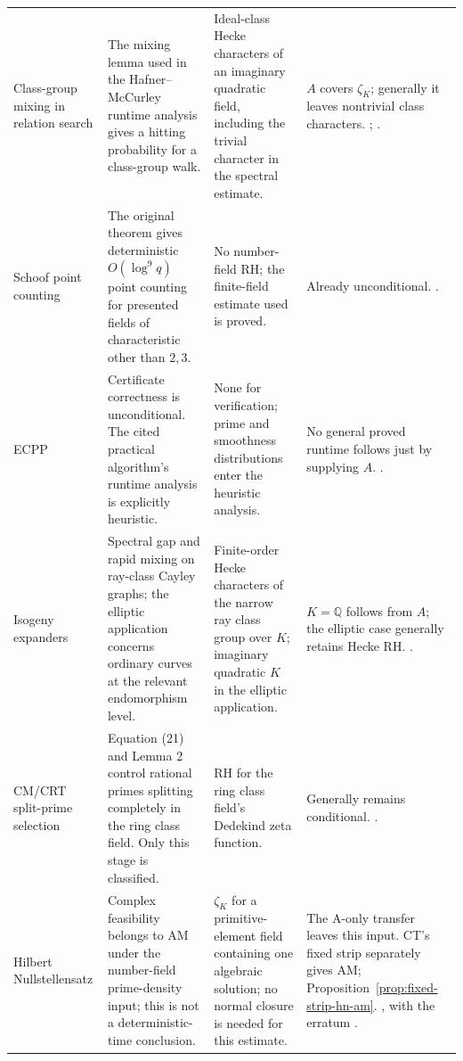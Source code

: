 \documentclass[11pt]{article}
\newcommand{\Q}{\mathbb Q}
\theoremstyle{definition}
\theoremstyle{remark}
\begin{document}
\begin{longtable}{@{}p{}p{}p{}p{}@{}}
Class-group mixing in relation search & The mixing lemma used in the Hafner--McCurley runtime analysis gives a hitting probability for a class-group walk. & Ideal-class Hecke characters of an imaginary quadratic field, including the trivial character in the spectral estimate. & $A$ covers $\zeta_K$; generally it leaves nontrivial class characters. \citet[Prop.~1, author pp.~8--9]{BiasseErukulangara2023}; \citet[Cor.~1.3, proof p.~9]{JMV2009}. \\
Schoof point counting & The original theorem gives deterministic $O(\log^9q)$ point counting for presented fields of characteristic other than $2,3$. & No number-field RH; the finite-field estimate used is proved. & Already unconditional. \citet[pp.~483, 485--490]{Schoof1985}. \\
ECPP & Certificate correctness is unconditional. The cited practical algorithm's runtime analysis is explicitly heuristic. & None for verification; prime and smoothness distributions enter the heuristic analysis. & No general proved runtime follows just by supplying $A$. \citet[Thm.~5.2, p.~121; pp.~122, 124--125]{Schoof2008}. \\
Isogeny expanders & Spectral gap and rapid mixing on ray-class Cayley graphs; the elliptic application concerns ordinary curves at the relevant endomorphism level. & Finite-order Hecke characters of the narrow ray class group over $K$; imaginary quadratic $K$ in the elliptic application. & $K=\Q$ follows from $A$; the elliptic case generally retains Hecke RH. \citet[Thms.~1.1, 1.5--1.6; proof p.~9]{JMV2009}. \\
CM/CRT split-prime selection & Equation (21) and Lemma 2 control rational primes splitting completely in the ring class field. Only this stage is classified. & RH for the ring class field's Dedekind zeta function. & Generally remains conditional. \citet[corrected author pp.~21--22]{Sutherland2011}. \\
Hilbert Nullstellensatz & Complex feasibility belongs to $\mathrm{AM}$ under the number-field prime-density input; this is not a deterministic-time conclusion. & $\zeta_K$ for a primitive-element field containing one algebraic solution; no normal closure is needed for this estimate. & The A-only transfer leaves this input. CT's fixed strip separately gives AM; Proposition~\ref{prop:fixed-strip-hn-am}. \citet[Thm.~9, p.~282]{Koiran1996}, with the erratum \citep{KoiranErratum1997}. \\
\end{longtable}
\endgroup
\end{document}
